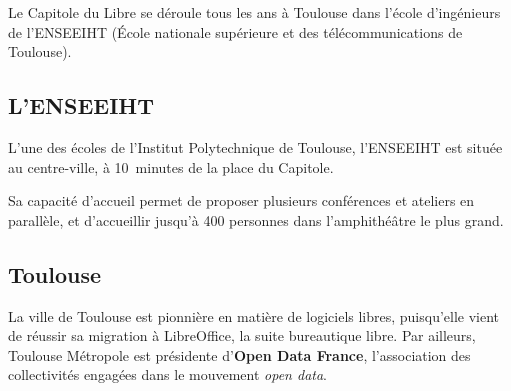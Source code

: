 
Le Capitole du Libre se déroule tous les ans à Toulouse dans l'école
 d'ingénieurs de l'ENSEEIHT (École nationale supérieure
 et des télécommunications de Toulouse). 

\subsection{L'ENSEEIHT}

L'une des écoles de l'Institut Polytechnique de Toulouse, l'ENSEEIHT
 est située au centre-ville, à 10~minutes de la place du Capitole.

Sa capacité d'accueil permet de proposer plusieurs conférences et
 ateliers en parallèle, et d'accueillir jusqu'à 400 personnes dans
 l'amphithéâtre le plus grand.

\subsection{Toulouse}

La ville de Toulouse est pionnière en matière de logiciels libres,
 puisqu'elle vient de réussir sa migration à LibreOffice, la suite
 bureautique libre. Par ailleurs, Toulouse Métropole est présidente d’\textbf{Open Data France}, l'association des collectivités engagées dans le mouvement \textit{open data}.

